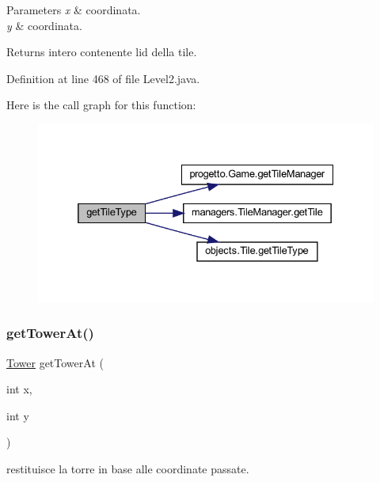 \begin{DoxyParams}{Parameters}
{\em x} & coordinata. \\
\hline
{\em y} & coordinata.\\
\hline
\end{DoxyParams}
\begin{DoxyReturn}{Returns}
intero contenente l\textquotesingle{}id della tile. 
\end{DoxyReturn}


Definition at line 468 of file Level2.\+java.

Here is the call graph for this function\+:\nopagebreak
\begin{figure}[H]
\begin{center}
\leavevmode
\includegraphics[width=332pt]{classscenes_1_1_level2_ac689e72523c8460ac3160526d310b1b7_cgraph}
\end{center}
\end{figure}
\mbox{\label{classscenes_1_1_level2_a4345f2e80059788e5ab1dd1cf0ff2c04}} 
\subsubsection{\texorpdfstring{get\+Tower\+At()}{getTowerAt()}}
{\footnotesize\ttfamily \hyperlink{classtowers_1_1_tower}{Tower} get\+Tower\+At (\begin{DoxyParamCaption}\item[{int}]{x,  }\item[{int}]{y }\end{DoxyParamCaption})\hspace{0.3cm}{\ttfamily [private]}}



restituisce la torre in base alle coordinate passate. 


